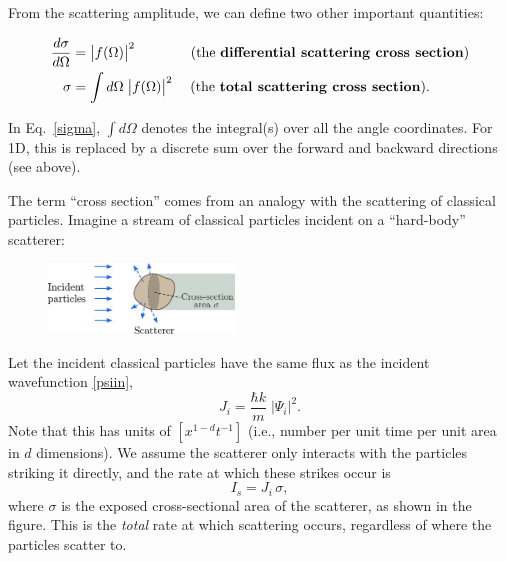 \documentclass[prx,12pt]{revtex4-2}
\begin{document}
From the scattering amplitude, we can define two other important
quantities:
\begin{framed}
  \begin{align}
    \frac{d\sigma}{d\Omega} &= \big|f(\Omega)\big|^2 \qquad\quad\quad \text{(the \textbf{differential scattering cross section})} \\ \sigma &= \int d\Omega\; \big|f(\Omega)\big|^2 \quad\; \text{(the \textbf{total scattering cross section}).} \label{sigma}
  \end{align}
\end{framed}
\vskip -0.1in
\noindent
In Eq.~\eqref{sigma}, $\int d\Omega$ denotes the integral(s) over all
the angle coordinates.  For 1D, this is replaced by a discrete sum
over the forward and backward directions (see above).

The term ``cross section'' comes from an analogy with the scattering
of classical particles.  Imagine a stream of classical particles
incident on a ``hard-body'' scatterer:

\begin{figure}[h]
  \centering\includegraphics[width=0.44\textwidth]{crosssection}
\end{figure}

\noindent
Let the incident classical particles have the same flux as the
incident wavefunction \eqref{psiin},
\begin{equation}
  J_{i} = \frac{\hbar k}{m} \;|\Psi_i|^2.
  \label{incidentflux}
\end{equation}
Note that this has units of $[x^{1-d}t^{-1}]$ (i.e., number per unit
time per unit area in $d$ dimensions).  We assume the scatterer only
interacts with the particles striking it directly, and the rate at
which these strikes occur is
\begin{equation}
  I_s = J_i \, \sigma,
  \label{scattersigma}
\end{equation}
where $\sigma$ is the exposed cross-sectional area of the scatterer,
as shown in the figure.  This is the \textit{total} rate at which
scattering occurs, regardless of where the particles scatter to.
\end{document}
